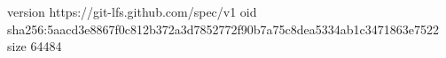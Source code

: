 version https://git-lfs.github.com/spec/v1
oid sha256:5aacd3e8867f0c812b372a3d7852772f90b7a75c8dea5334ab1c3471863e7522
size 64484
